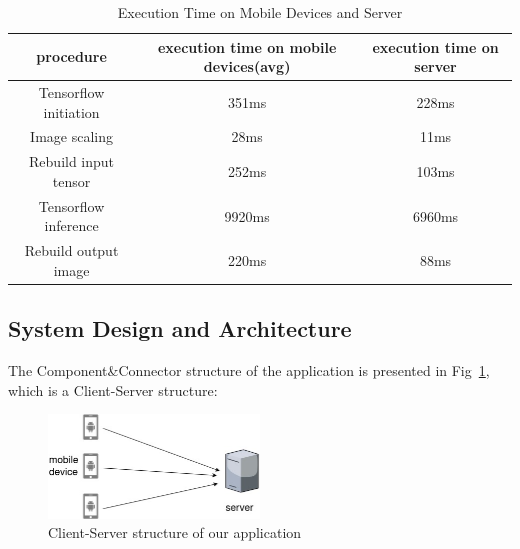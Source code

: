 \documentclass[a4paper,11pt,onecolumn,twoside]{article}
\begin{document}
\begin{CJK*}{GBK}{song}

\begin{table}[H]
  \centering
  \caption{Execution Time on Mobile Devices and Server}\label{tb:1}
  \begin{tabular}{ccc}
    \hline
    procedure & execution time on mobile devices(avg) & execution time on server\\
    \hline
    Tensorflow initiation & 351ms & 228ms\\
    
    Image scaling & 28ms & 11ms\\
    
    Rebuild input tensor & 252ms & 103ms\\
    
    Tensorflow inference & 9920ms & 6960ms\\
    
    Rebuild output image & 220ms & 88ms\\
    \hline
  \end{tabular}
\end{table}



\subsection{System Design and Architecture}


The Component\&Connector structure of the application 
is presented in Fig~\ref{C&C}, which is a Client-Server structure:

\begin{figure}[!htb] %
  \centering %
  \includegraphics[width=0.5\textwidth]{C&C} %
  \caption{Client-Server structure of our application} %
  \label{C&C} %
\end{figure}


\end{CJK*}
\end{document}
